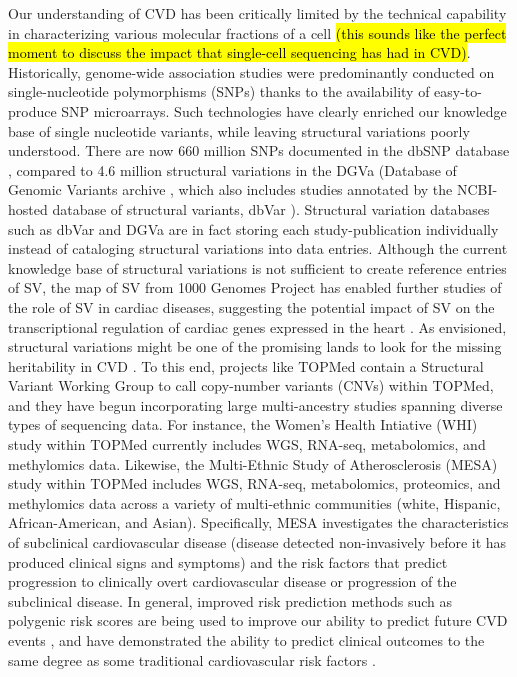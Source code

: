 \documentclass[letter]{bioinfo}
\begin{document}
	Our understanding of CVD has been critically limited by the technical capability in characterizing various molecular fractions of a cell \hl{(this sounds like the perfect moment to discuss the impact that single-cell sequencing has had in CVD)}. Historically, genome-wide association studies were predominantly conducted on single-nucleotide polymorphisms (SNPs) thanks to the availability of easy-to-produce SNP microarrays. Such technologies have clearly enriched our knowledge base of single nucleotide variants, while leaving structural variations poorly understood. There are now 660 million SNPs documented in the dbSNP database \citep{NCBI:2018:dbSNP}, compared to 4.6 million structural variations in the DGVa (Database of Genomic Variants archive \citep{EMBL-EBI:2018:Database}, which also includes studies annotated by the NCBI-hosted database of structural variants, dbVar \citep{NCBI:2018:dbVar}).  Structural variation databases such as dbVar and DGVa are in fact storing each study-publication individually instead of cataloging structural variations into data entries. Although the current knowledge base of structural variations is not sufficient to create reference entries of SV, the map of SV from 1000 Genomes Project \citep{Sudmant:2015:integrated} has enabled further studies of the role of SV in cardiac diseases, suggesting the potential impact of SV on the transcriptional regulation of cardiac genes expressed in the heart \citep{Haas:2018:Genomic}. As envisioned, structural variations might be one of the promising lands to look for the missing heritability in CVD \citep{Eichler:2010:Missing}.  To this end, projects like TOPMed contain a Structural Variant Working Group to call copy-number variants (CNVs) within TOPMed, and they have begun incorporating large multi-ancestry studies spanning diverse types of sequencing data.  For instance, the Women's Health Intiative (WHI) study \citep{NHLBI:1991:Women} within TOPMed currently includes WGS, RNA-seq, metabolomics, and methylomics data.  Likewise, the Multi-Ethnic Study of Atherosclerosis (MESA) study \citep{Bild:2002:MultiEthnic} within TOPMed includes WGS, RNA-seq, metabolomics, proteomics, and methylomics data across a variety of multi-ethnic communities (white, Hispanic, African-American, and Asian).  Specifically, MESA investigates the characteristics of subclinical cardiovascular disease (disease detected non-invasively before it has produced clinical signs and symptoms) and the risk factors that predict progression to clinically overt cardiovascular disease or progression of the subclinical disease.  In general, improved risk prediction methods such as polygenic risk scores are being used to improve our ability to predict future CVD events \citep{Goldstein:2014:Simple} , and have demonstrated the ability to predict clinical outcomes to the same degree as some traditional cardiovascular risk factors \citep{deVries:2015:Incremental}. 
	
\end{document}
